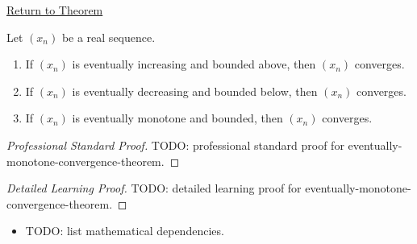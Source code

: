 \newpage
{}
\label{prf:eventually-monotone-convergence-theorem}

\begin{remark*}[Return]
\hyperref[thm:eventually-monotone-convergence-theorem]{Return to Theorem}
\end{remark*}

\begin{theorem*}
Let $(x_n)$ be a real sequence.
\begin{enumerate}[label=(\alph*)]
  \item If $(x_n)$ is eventually increasing and bounded above, then
  $(x_n)$ converges.
  \item If $(x_n)$ is eventually decreasing and bounded below, then
  $(x_n)$ converges.
  \item If $(x_n)$ is eventually monotone and bounded, then $(x_n)$ converges.
\end{enumerate}

\smallskip
\noindent
\end{theorem*}

\begin{proof}[Professional Standard Proof]
\LRAProofBodyStart
TODO: professional standard proof for eventually-monotone-convergence-theorem.
\end{proof}

\begin{proof}[Detailed Learning Proof]
\LRAProofBodyStart
TODO: detailed learning proof for eventually-monotone-convergence-theorem.
\end{proof}

\begin{remark*}
\end{remark*}

\begin{dependencies}
\begin{itemize}
  \item TODO: list mathematical dependencies.
\end{itemize}
\end{dependencies}

\clearpage
